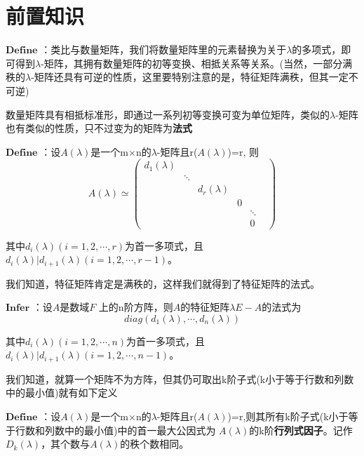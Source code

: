 \documentclass[a4paper,12pt]{book}
\begin{document}
\section{前置知识}

$\mathbf{Define}$ ：类比与数量矩阵，我们将数量矩阵里的元素替换为关于$\lambda$的多项式，即可得到$\lambda$-矩阵，其拥有数量矩阵的初等变换、相抵关系等关系。(当然，一部分满秩的$\lambda$-矩阵还具有可逆的性质，这里要特别注意的是，特征矩阵满秩，但其一定不可逆)

数量矩阵具有相抵标准形，即通过一系列初等变换可变为单位矩阵，类似的$\lambda$-矩阵也有类似的性质，只不过变为的矩阵为\textbf{法式}

$\mathbf{Define}$ ：设$\mathit{A}(\lambda)$是一个m$\times$n的$\lambda$-矩阵且r($\mathit{A}(\lambda)$)=r,
则
\begin{equation*}
\mathit{A}(\lambda)\simeq 
\begin{pmatrix}
	d_{1}(\lambda ) &  &  &  &  & \\
	&  \ddots &  &  &  & \\
	&  &  d_{r}(\lambda )&  &  & \\
	&  &  &  0&  & \\
	&  &  &  &  \ddots & \\
	&  &  &  &  0&
\end{pmatrix}
\end{equation*}


其中$d_{i}(\lambda )(i=1,2,\cdots,r)$为首一多项式，且$d_{i}(\lambda )|d_{i+1}(\lambda )(i=1,2,\cdots,r-1)$。

我们知道，特征矩阵肯定是满秩的，这样我们就得到了特征矩阵的法式。

$\mathbf{Infer}$ ：设$\mathit{A}$是数域$\mathit{F}$
上的n阶方阵，则$\mathit{A}$的特征矩阵$\lambda\mathit{E-A}$的法式为
\begin{equation*}
	diag(d_{1}(\lambda ),\cdots,d_{n}(\lambda ))
\end{equation*}

其中$d_{i}(\lambda )(i=1,2,\cdots,n)$为首一多项式，且$d_{i}(\lambda )|d_{i+1}(\lambda )(i=1,2,\cdots,n-1)$。

我们知道，就算一个矩阵不为方阵，但其仍可取出k阶子式(k小于等于行数和列数中的最小值)就有如下定义

$\mathbf{Define}$ ：设$\mathit{A}(\lambda)$是一个m$\times$n的$\lambda$-矩阵且r($\mathit{A}(\lambda)$)=r,则其所有k阶子式(k小于等于行数和列数中的最小值)中的首一最大公因式为
$\mathit{A}(\lambda)$的k阶\textbf{行列式因子}。记作$\mathit{D_{k}}(\lambda)$，其个数与$\mathit{A}(\lambda)$的秩个数相同。~\\
\end{document}
